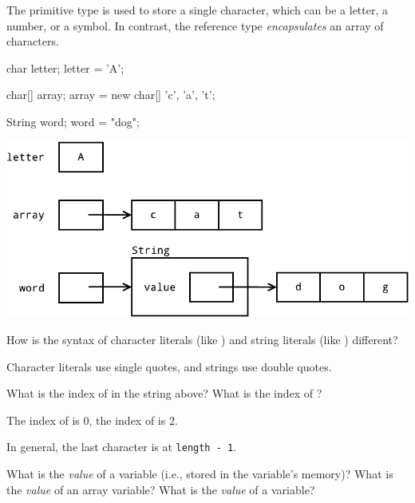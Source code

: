 
The primitive type  is used to store a single character, which can be a letter, a number, or a symbol.
In contrast, the reference type  \emph{encapsulates} an array of characters.

\begin{minipage}[t]{150pt}
\begin{javalst}
char letter;
letter = 'A';

char[] array;
array = new char[]
        {'c', 'a', 't'};

String word;
word = "dog";
\end{javalst}
\end{minipage}
\hfill
\begin{minipage}[t]{345pt}
\null
\includegraphics[width=\linewidth]{string1.pdf}
\null
\end{minipage}




\Q How is the syntax of character literals (like ) and string literals (like ) different?

\begin{answer}
Character literals use single quotes, and strings use double quotes.
\end{answer}


\Q What is the index of  in the string above?
What is the index of ?

\begin{answer}
The index of  is 0, the index of  is 2.

\medskip
In general, the last character is at {\tt length - 1}.
\end{answer}


\Q What is the {\it value} of a  variable (i.e., stored in the variable's memory)?
What is the {\it value} of an array variable?
What is the {\it value} of a  variable?


